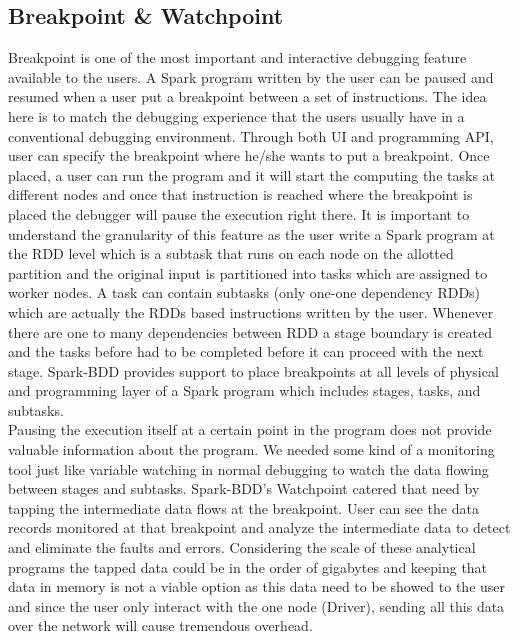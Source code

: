 \documentclass{acm_proc_article-sp}
\begin{document}
\subsection{Breakpoint \& Watchpoint}
Breakpoint is one of the most important and interactive debugging feature available to the users. A Spark program written by the user can be paused and resumed when a user put a breakpoint between a set of instructions. The idea here is to match the debugging experience that the users usually have in a conventional debugging environment. Through both UI and programming API, user can specify the breakpoint where he/she wants to put a breakpoint. Once placed, a user can run the program and it will start the computing the tasks at different nodes and once that instruction is reached where the breakpoint is placed the debugger will pause the execution right there. It is important to understand the granularity of this feature as the user write a Spark program at the RDD level which is a subtask that runs on each node on the allotted partition and the original input is partitioned into tasks which are assigned to worker nodes. A task can contain subtasks (only one-one dependency RDDs) which are actually the RDDs based instructions written by the user. Whenever there are one to many dependencies between RDD a stage boundary is created and the tasks before had to be completed before it can proceed with the next stage. Spark-BDD provides support to place breakpoints at all levels of physical and programming layer of a Spark program which includes stages, tasks, and subtasks.\\
Pausing the execution itself at a certain point in the program does not provide valuable information about the program. We needed some kind of a monitoring tool just like variable watching in normal debugging to watch the data flowing between stages and subtasks. Spark-BDD's Watchpoint catered that need by tapping the intermediate data flows at the breakpoint. User can see the data records monitored at that breakpoint and analyze the intermediate data to detect and eliminate the faults and errors. Considering the scale of these analytical programs the tapped data could be in the order of gigabytes and keeping that data in memory is not a viable option as this data need to be showed to the user and since the user only interact with the one node (Driver), sending all this data over the network will cause tremendous overhead. \\
\end{document}
